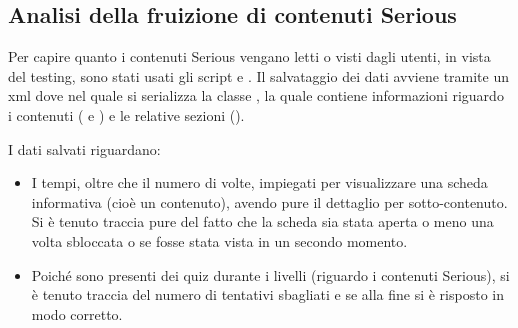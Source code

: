 \subsection{Analisi della fruizione di contenuti Serious}
\label{analisiFruizione}

Per capire quanto i contenuti Serious vengano letti o visti dagli utenti, in vista del testing, sono stati usati gli script  e . Il salvataggio dei dati avviene tramite un xml dove nel quale si serializza la classe , la quale contiene informazioni riguardo i contenuti ( e ) e le relative sezioni ().

I dati salvati riguardano:

\begin{itemize}

\item I tempi, oltre che il numero di volte, impiegati per visualizzare una scheda informativa (cioè un contenuto), avendo pure il dettaglio per sotto-contenuto. Si è tenuto traccia pure del fatto che la scheda sia stata aperta o meno una volta sbloccata o se fosse stata vista in un secondo momento.
\item Poiché sono presenti dei quiz durante i livelli (riguardo i contenuti Serious), si è tenuto traccia del numero di tentativi sbagliati e se alla fine si è risposto in modo corretto.

\end{itemize}

\newpage
